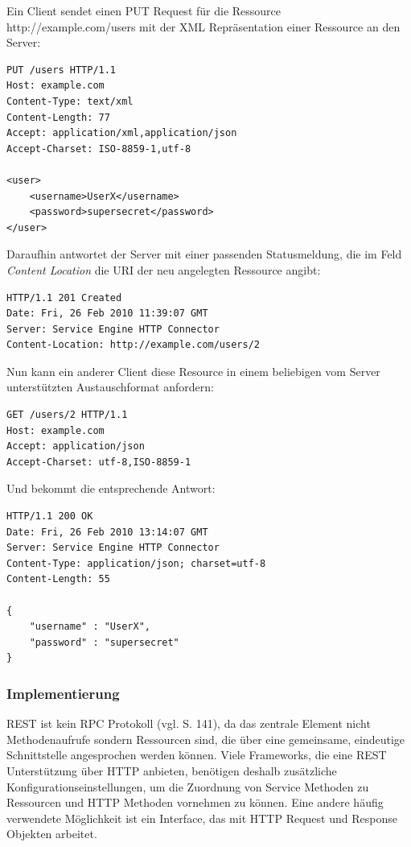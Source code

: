 Ein Client sendet einen PUT Request für die Ressource \\
http://example.com/users mit der \ac{XML} Repräsentation einer Ressource an den
Server:
\lstset{language = Python}
\begin{lstlisting}[caption=HTTP PUT Request, label=lst:httpput]
PUT /users HTTP/1.1
Host: example.com
Content-Type: text/xml
Content-Length: 77
Accept: application/xml,application/json
Accept-Charset: ISO-8859-1,utf-8

<user>
	<username>UserX</username>
	<password>supersecret</password>
</user>
\end{lstlisting}
Daraufhin antwortet der Server mit einer passenden Statusmeldung, die im Feld
\emph{Content Location} die \ac{URI} der neu angelegten Ressource angibt:
\begin{lstlisting}[caption=HTTP PUT Antwort, label=lst:httpputeresp]
HTTP/1.1 201 Created
Date: Fri, 26 Feb 2010 11:39:07 GMT
Server: Service Engine HTTP Connector
Content-Location: http://example.com/users/2
\end{lstlisting}
\pagebreak
Nun kann ein anderer Client diese Resource in einem beliebigen vom Server
unterstützten Austauschformat anfordern:
\begin{lstlisting}[caption=HTTP GET Request, label=lst:httpget]
GET /users/2 HTTP/1.1
Host: example.com
Accept: application/json
Accept-Charset: utf-8,ISO-8859-1
\end{lstlisting}
Und bekommt die entsprechende Antwort:
\begin{lstlisting}[caption=HTTP GET Antwort, label=lst:httpgetresp]
HTTP/1.1 200 OK
Date: Fri, 26 Feb 2010 13:14:07 GMT
Server: Service Engine HTTP Connector
Content-Type: application/json; charset=utf-8
Content-Length: 55

{
	"username" : "UserX",
	"password" : "supersecret"
}
\end{lstlisting}

\subsubsection{Implementierung}
\ac{REST} ist kein \ac{RPC} Protokoll (vgl. \cite{fielding:2000} S. 141), da das
zentrale Element nicht Methodenaufrufe sondern Ressourcen sind, die über eine
gemeinsame, eindeutige Schnittstelle angesprochen werden können. Viele
Frameworks, die eine \ac{REST} Unterstützung über \ac{HTTP} anbieten, benötigen
deshalb zusätzliche Konfigurationseinstellungen, um die Zuordnung von Service
Methoden zu Ressourcen und \ac{HTTP} Methoden vornehmen zu können. Eine andere
häufig verwendete Möglichkeit ist ein Interface, das mit \ac{HTTP} Request und
Response Objekten arbeitet.

